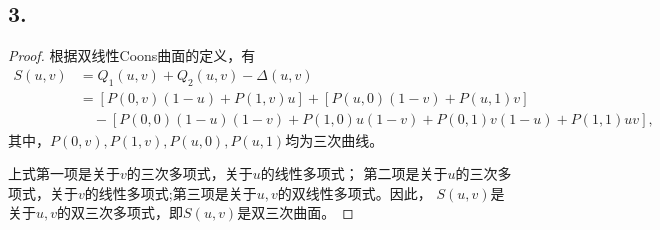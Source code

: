 \documentclass[utf8]{ctexart}
\begin{document}
\subsection*{3.}
\begin{proof}
    根据双线性Coons曲面的定义，有
    $$
    \begin{aligned}
    S(u,v) &= Q_1(u,v) + Q_2(u, v) - \Delta(u,v)\\
    &= [P(0,v)(1-u) + P(1,v)u] + [P(u,0)(1-v)+P(u,1)v] \\
    &\quad - [P(0,0)(1-u)(1-v)+P(1,0)u(1-v)+P(0,1)v(1-u)+P(1,1)uv],
    \end{aligned}
    $$
    其中，$P(0,v),P(1,v),P(u,0),P(u,1)$均为三次曲线。\par
    上式第一项是关于$v$的三次多项式，关于$u$的线性多项式；
    第二项是关于$u$的三次多项式，关于$v$的线性多项式;第三项是关于$u,v$的双线性多项式。因此，
    $S(u,v)$是关于$u,v$的双三次多项式，即$S(u,v)$是双三次曲面。
\end{proof}
\end{document}
